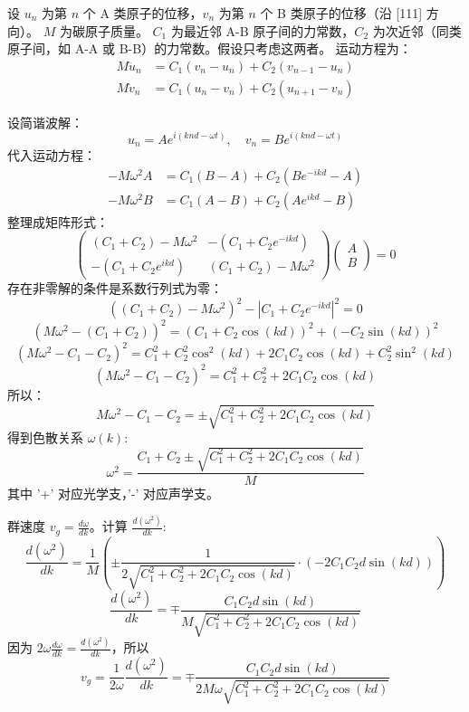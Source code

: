 \documentclass{ctexart}
\begin{document}
设 $u_n$ 为第 $n$ 个 A 类原子的位移，$v_n$ 为第 $n$ 个 B 类原子的位移（沿 [111] 方向）。 $M$ 为碳原子质量。 $C_1$ 为最近邻 A-B 原子间的力常数，$C_2$ 为次近邻（同类原子间，如 A-A 或 B-B）的力常数。假设只考虑这两者。
运动方程为：
\begin{align*}
  M \ddot{u}_n &= C_1(v_n - u_n) + C_2(v_{n-1} - u_n) \\ %
  M \ddot{v}_n &= C_1(u_n - v_n) + C_2(u_{n+1} - v_n) %
\end{align*}

设简谐波解：
\[ u_n = A e^{i(knd - \omega t)}, \quad v_n = B e^{i(knd - \omega t)} \]
代入运动方程：
\begin{align*}
  -M\omega^2 A &= C_1(B - A) + C_2(B e^{-ikd} - A) \\
  -M\omega^2 B &= C_1(A - B) + C_2(A e^{ikd} - B)
\end{align*}
整理成矩阵形式：
\[
\begin{pmatrix}
(C_1 + C_2) - M\omega^2 & -(C_1 + C_2 e^{-ikd}) \\
-(C_1 + C_2 e^{ikd}) & (C_1 + C_2) - M\omega^2
\end{pmatrix}
\begin{pmatrix} A \\ B \end{pmatrix}
= 0
\]
存在非零解的条件是系数行列式为零：
\[ \left( (C_1 + C_2) - M\omega^2 \right)^2 - |C_1 + C_2 e^{-ikd}|^2 = 0 \]
\[ \left( M\omega^2 - (C_1 + C_2) \right)^2 = (C_1 + C_2 \cos(kd))^2 + (-C_2 \sin(kd))^2 \]
\[ \left( M\omega^2 - C_1 - C_2 \right)^2 = C_1^2 + C_2^2 \cos^2(kd) + 2C_1 C_2 \cos(kd) + C_2^2 \sin^2(kd) \]
\[ \left( M\omega^2 - C_1 - C_2 \right)^2 = C_1^2 + C_2^2 + 2C_1 C_2 \cos(kd) \]
所以：
\[ M\omega^2 - C_1 - C_2 = \pm \sqrt{C_1^2 + C_2^2 + 2C_1 C_2 \cos(kd)} \]
得到色散关系 $\omega(k)$:
\[ \omega^2 = \frac{C_1 + C_2 \pm \sqrt{C_1^2 + C_2^2 + 2C_1 C_2 \cos(kd)}}{M} \]
其中 '+' 对应光学支，'-' 对应声学支。

群速度 $v_g = \frac{d\omega}{dk}$。计算 $\frac{d(\omega^2)}{dk}$:
\[ \frac{d(\omega^2)}{dk} = \frac{1}{M} \left( \pm \frac{1}{2\sqrt{C_1^2 + C_2^2 + 2C_1 C_2 \cos(kd)}} \cdot (-2C_1 C_2 d \sin(kd)) \right) \]
\[ \frac{d(\omega^2)}{dk} = \mp \frac{C_1 C_2 d \sin(kd)}{M \sqrt{C_1^2 + C_2^2 + 2C_1 C_2 \cos(kd)}} \]
因为 $2\omega \frac{d\omega}{dk} = \frac{d(\omega^2)}{dk}$，所以
\[ v_g = \frac{1}{2\omega} \frac{d(\omega^2)}{dk} = \mp \frac{C_1 C_2 d \sin(kd)}{2 M \omega \sqrt{C_1^2 + C_2^2 + 2C_1 C_2 \cos(kd)}} \]
\end{document}
